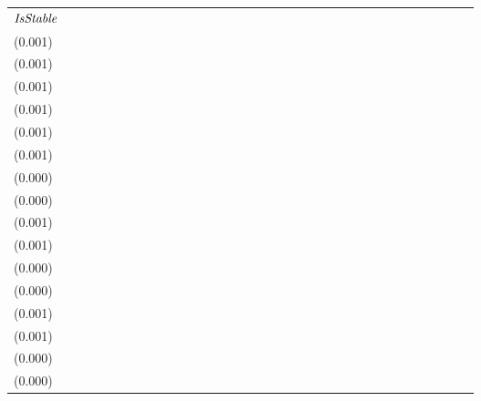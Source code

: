\begin{tabular}{lllllllllllllllllllllllllllllllll}
${\it IsStable}$             &   \makecell{$0.084^{**}$ \\(0.001)} &   \makecell{$0.084^{**}$ \\(0.001)} &                                     &                                     &   \makecell{$0.007^{**}$ \\(0.001)} &   \makecell{$0.007^{**}$ \\(0.001)} &                                     &                                    &  \makecell{$-0.050^{**}$ \\(0.001)} &  \makecell{$-0.051^{**}$ \\(0.001)} &                                     &                                     &  \makecell{$-0.001^{**}$ \\(0.000)} &  \makecell{$-0.001^{**}$ \\(0.000)} &                                     &                                     &  \makecell{$-0.059^{**}$ \\(0.001)} &  \makecell{$-0.060^{**}$ \\(0.001)} &                                     &                                     &  \makecell{$-0.002^{**}$ \\(0.000)} &  \makecell{$-0.002^{**}$ \\(0.000)} &                                     &                                     &   \makecell{$0.007^{**}$ \\(0.001)} &   \makecell{$0.007^{**}$ \\(0.001)} &                                     &                                    &   \makecell{$0.000^{*}$ \\(0.000)} &   \makecell{$0.000^{*}$ \\(0.000)} &                                    &                                    \\

\end{tabular}
